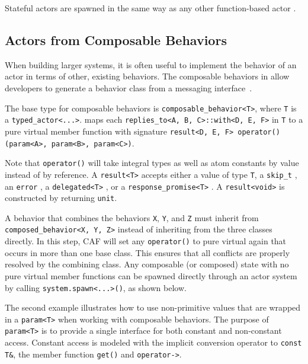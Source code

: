 

Stateful actors are spawned in the same way as any other function-based actor .



\clearpage
\subsection{Actors from Composable Behaviors \experimental}
\label{composable-behavior}

When building larger systems, it is often useful to implement the behavior of an actor in terms of other, existing behaviors. The composable behaviors in \lib allow developers to generate a behavior class from a messaging interface~.

The base type for composable behaviors is \lstinline^composable_behavior<T>^, where \lstinline^T^ is a \lstinline^typed_actor<...>^. \lib maps each \lstinline^replies_to<A, B, C>::with<D, E, F>^ in \lstinline^T^ to a pure virtual member function with signature \lstinline^result<D, E, F> operator()(param<A>, param<B>, param<C>)^.

Note that \lstinline^operator()^ will take integral types as well as atom constants by value instead of by reference. A \lstinline^result<T>^ accepts either a value of type \lstinline^T^, a \lstinline^skip_t^ , an \lstinline^error^ , a \lstinline^delegated<T>^ , or a \lstinline^response_promise<T>^ . A \lstinline^result<void>^ is constructed by returning \lstinline^unit^.

A behavior that combines the behaviors \lstinline^X^, \lstinline^Y^, and \lstinline^Z^ must inherit from \lstinline^composed_behavior<X, Y, Z>^ instead of inheriting from the three classes directly. In this step, CAF will set any \lstinline^operator()^ to pure virtual again that occurs in more than one base class. This ensures that all conflicts are properly resolved by the combining class. Any composable (or composed) state with no pure virtual member functions can be spawned directly through an actor system by calling \lstinline^system.spawn<...>()^, as shown below.



\clearpage
The second example illustrates how to use non-primitive values that are wrapped in a \lstinline^param<T>^ when working with composable behaviors. The purpose of \lstinline^param<T>^ is to provide a single interface for both constant and non-constant access. Constant access is modeled with the implicit conversion operator to \lstinline^const T&^, the member function \lstinline^get()^ and \lstinline^operator->^. 

